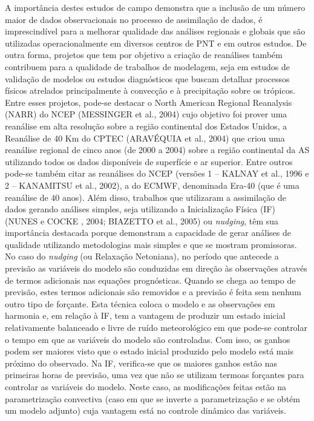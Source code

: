 A importância destes estudos de campo demonstra que a inclusão de um número maior de dados observacionais no processo de assimilação de dados, é imprescindível para a melhorar qualidade das análises regionais e globais que são utilizadas  operacionalmente em diversos centros de PNT e em outros estudos. De outra forma, projetos que tem por objetivo a criação de reanálises também contribuem para a qualidade de trabalhos de modelagem, seja em estudos de validação de modelos ou estudos diagnósticos que buscam detalhar processos físicos atrelados principalmente à convecção e à precipitação sobre os trópicos. Entre esses projetos, pode-se destacar o North American Regional Reanalysis (NARR) do NCEP (MESSINGER et al., 2004) cujo objetivo foi prover uma reanálise em alta resolução sobre a região continental dos Estados Unidos, a Reanálise de 40 Km do CPTEC (ARAVÉQUIA et al., 2004) que criou uma reanálise regional de cinco anos (de 2000 a 2004) sobre a região continental da AS utilizando todos os dados disponíveis de superfície e ar superior. Entre outros pode-se também citar as reanálises do NCEP (versões 1 – KALNAY et al., 1996 e 2 – KANAMITSU et al., 2002), a do ECMWF, denominada Era-40 (que é uma reanálise de 40 anos). Além disso, trabalhos que utilizaram a assimilação de dados gerando análises simples, seja utilizando a Inicialização Física (IF) (NUNES e COCKE , 2004; BIAZETTO et al., 2005) ou \textit{nudging}, têm sua importância destacada porque demonstram a capacidade de gerar análises de qualidade utilizando metodologias mais simples e que se mostram promissoras. No caso do \textit{nudging} (ou Relaxação Netoniana), no período que antecede a previsão as variáveis do modelo são conduzidas em direção às observações através de termos adicionais nas equações prognósticas. Quando se chega ao tempo de previsão, estes termos adicionais são removidos e a previsão é feita sem nenhum outro tipo de forçante. Esta técnica coloca o modelo e as observações em harmonia e, em relação à IF, tem a vantagem de produzir um estado inicial relativamente balanceado e livre de ruído meteorológico em que pode-se controlar o tempo em que as variáveis do modelo são controladas. Com isso, os ganhos podem ser maiores visto que o estado inicial produzido pelo modelo está mais próximo do observado. Na IF, verifica-se que os maiores ganhos estão nas primeiras horas de previsão, uma vez que não se utilizam termoas forçantes para controlar as variáveis do modelo. Neste caso, as modificações feitas estão na parametrização convectiva (caso em que se inverte a parametrização e se obtém um modelo adjunto) cuja vantagem está no controle dinâmico das variáveis.

